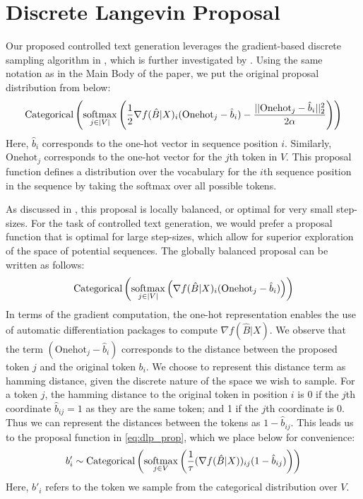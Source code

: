 \section{Discrete Langevin Proposal}\label{appndx:dlp_proposal}
Our proposed controlled text generation leverages the gradient-based discrete sampling algorithm in \citet{zhang2022langevinlike}, which is further investigated by \citet{pynadath2024gradientbaseddiscretesamplingautomatic}. Using the same notation as in the Main Body of the paper, we put the original proposal distribution from \citet{zhang2022langevinlike} below:
\[
\text{Categorical} \left( \underset{j \in |V|}{\mathrm{softmax}} \left( \frac{1}{2} \nabla f(\hat{B} | X)_i (\text{Onehot}_j - \hat{b}_i) - \frac{||\text{Onehot}_j - \hat{b}_i ||^2_2}{2\alpha}\right) \right)
\]
Here, $\hat{b}_i$ corresponds to the one-hot vector in sequence position $i$. Similarly, $\text{Onehot}_j$ corresponds to the one-hot vector for the $j$th token in $V$. This proposal function defines a distribution over the vocabulary for the $i$th sequence position in the sequence by taking the softmax over all possible tokens.

As discussed in \citet{pynadath2024gradientbaseddiscretesamplingautomatic}, this proposal is locally balanced, or optimal for very small step-sizes. For the task of controlled text generation, we would prefer a proposal function that is optimal for large step-sizes, which allow for superior exploration of the space of potential sequences. The globally balanced proposal can be written as follows: 
\[
\text{Categorical} \left( \underset{j \in |V|}{\mathrm{softmax}} \left( \nabla f(\hat{B} | X)_i (\text{Onehot}_j- \hat{b}_i) \right) \right)
\]
In terms of the gradient computation, the one-hot representation  enables the use of automatic differentiation packages to compute $\nabla f(\hat{B} | X)$. We observe that the term 
$(\text{Onehot}_j - \hat{b}_i)$ corresponds to the distance between the proposed token $j$ and the original token $b_i$. We choose to represent this distance term as hamming distance, given the discrete nature of the space we wish to sample. For a token $j$, the hamming distance to the original token in position $i$ is 0 if the $j$th coordinate $\hat{b}_{ij} = 1$ as they are the same token; and 1 if the $j$th coordinate is 0. Thus we can represent the distances between the tokens as $1 - \hat{b}_{ij}$. This leads us to the proposal function in \ref{eq:dlp_prop}, which we place below for convenience: 
\[
b'_i \sim
    \operatorname*{Categorical}\left(\underset{j \in V}{\mathrm{softmax}} \left( \frac{1}{\tau} (\nabla f(\hat{B} | X))_{ij} (1 - \hat{b}_{ij}) \right) \right)
\]
Here, $b'_i$ refers to the token we sample from the categorical distribution over $V$. 

